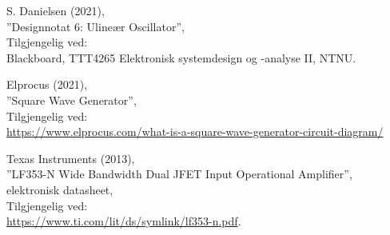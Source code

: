 \documentclass[a4paper,11pt,norsk]{article}
\begin{document}
\newpage
{}
\begin{thebibliography}{99}
S. Danielsen (2021),  \\
''Designnotat 6: Ulineær Oscillator'', \\
Tilgjengelig ved: \\
Blackboard, TTT4265 Elektronisk systemdesign og -analyse II, NTNU.

 Elprocus (2021), \\ ''Square Wave Generator'', \\
Tilgjengelig ved: \\
\href{https://www.elprocus.com/what-is-a-square-wave-generator-circuit-diagram/}{https://www.elprocus.com/what-is-a-square-wave-generator-circuit-diagram/}

Texas Instruments (2013), \\
''LF353-N Wide Bandwidth Dual JFET Input Operational Amplifier'', \\
elektronisk datasheet, \\
Tilgjengelig ved: \\
\href{https://www.ti.com/lit/ds/symlink/lf353-n.pdf}{https://www.ti.com/lit/ds/symlink/lf353-n.pdf}.

\end{thebibliography}
\end{document}
